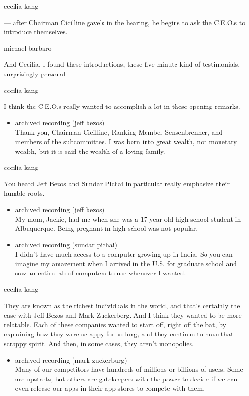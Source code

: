 cecilia kang

--- after Chairman Cicilline gavels in the hearing, he begins to ask the
C.E.O.s to introduce themselves.

michael barbaro

And Cecilia, I found these introductions, these five-minute kind of
testimonials, surprisingly personal.

cecilia kang

I think the C.E.O.s really wanted to accomplish a lot in these opening
remarks.

\begin{itemize}
\tightlist
\item
  archived recording (jeff bezos)\\
  Thank you, Chairman Cicilline, Ranking Member Sensenbrenner, and
  members of the subcommittee. I was born into great wealth, not
  monetary wealth, but it is said the wealth of a loving family.
\end{itemize}

cecilia kang

You heard Jeff Bezos and Sundar Pichai in particular really emphasize
their humble roots.

\begin{itemize}
\item
  archived recording (jeff bezos)\\
  My mom, Jackie, had me when she was a 17-year-old high school student
  in Albuquerque. Being pregnant in high school was not popular.
\item
  archived recording (sundar pichai)\\
  I didn't have much access to a computer growing up in India. So you
  can imagine my amazement when I arrived in the U.S. for graduate
  school and saw an entire lab of computers to use whenever I wanted.
\end{itemize}

cecilia kang

They are known as the richest individuals in the world, and that's
certainly the case with Jeff Bezos and Mark Zuckerberg. And I think they
wanted to be more relatable. Each of these companies wanted to start
off, right off the bat, by explaining how they were scrappy for so long,
and they continue to have that scrappy spirit. And then, in some cases,
they aren't monopolies.

\begin{itemize}
\tightlist
\item
  archived recording (mark zuckerburg)\\
  Many of our competitors have hundreds of millions or billions of
  users. Some are upstarts, but others are gatekeepers with the power to
  decide if we can even release our apps in their app stores to compete
  with them.
\end{itemize}

